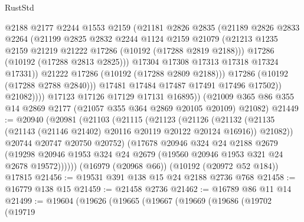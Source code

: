 \begin{lexlean}{RustStd}
\begin{coremodule}
                        @2188
                        @2177
                        @2244
                        @1553
                        @2159
                        (@21181
                          @2826
                          @2835
                          (@21189
                            @2826
                            @2833
                            @2264
                            (@21199
                              @2825
                              @2832
                              @2244
                              @1124
                              @2159
                              @21079
                              (@21213
                                @1235
                                @2159
                                @21219
                                @21222
                                @17286
                                (@10192 (@17288 @2819 @2188)))
                              @17286
                              (@10192 (@17288 @2813 @2825)))
                            @17304
                            @17308
                            @17313
                            @17318
                            @17324
                            @17331))
                        @21222
                        @17286
                        (@10192 (@17288 @2809 @2188)))
                      @17286
                      (@10192 (@17288 @2788 @2840)))
                    @17481
                    @17484
                    @17487
                    @17491
                    @17496
                    @17502))
                @21082))))
        @17123
        @17126
        @17129
        @17131
        @16895))
    (@21009 @365 @86 @355 @14 @2869 @2177 (@21057 @355 @364 @2869 @20105 @20109) @21082)
@21449 := @20940
    (@20981
      (@21103
        (@21115
          (@21123
            (@21126
              (@21132 (@21135 (@21143 (@21146 @21402) @20116 @20119 @20122 @20124 @16916)) @21082))
            @20744
            @20747
            @20750
            @20752)
          (@17678
            @20946
            @324
            @24
            @2188
            @2679
            (@19298 @20946 @1953 @324 @24 @2679 (@19560 @20946 @1953 @321 @24 @2678 @19572))))))
    (@16979 (@20968 @66))
    (@10192 (@20972 @52 @184))
    @17815
@21456 := @19531 @391 @138 @15 @24 @2188 @2736 @768
@21458 := @16779 @138 @15
@21459 := @21458 @2736
@21462 := @16789 @86 @11 @14
@21499 := @19604
    (@19626
      (@19665
        (@19667
          (@19669
            (@19686
              (@19702
                (@19719

\end{coremodule}
\end{lexlean}
